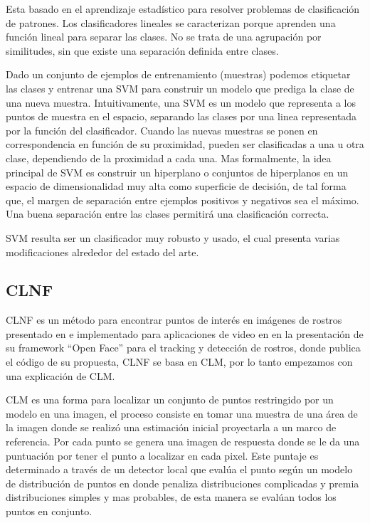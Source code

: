 Esta basado en el aprendizaje estadístico para resolver problemas de clasificación de patrones. Los clasificadores lineales se caracterizan porque aprenden una función lineal para separar las clases. No se trata de una agrupación por similitudes, sin que existe una separación definida entre clases.

Dado un conjunto de ejemplos de entrenamiento (muestras) podemos etiquetar las clases y entrenar una SVM para construir un modelo que prediga la clase de una nueva muestra. Intuitivamente, una SVM es un modelo que representa a los puntos de muestra en el espacio, separando las clases por una linea representada por la función del clasificador. Cuando las nuevas muestras se ponen en correspondencia en función de su proximidad, pueden ser clasificadas a una u otra clase, dependiendo de la proximidad a cada una. Mas formalmente, la idea principal de SVM es construir un hiperplano o conjuntos de hiperplanos en un espacio de dimensionalidad muy alta como superficie de decisión, de tal forma que, el margen de separación entre ejemplos positivos y negativos sea el máximo. Una buena separación entre las clases permitirá una clasificación correcta. 

\ac{SVM} resulta ser un clasificador muy robusto y usado, el cual presenta varias modificaciones alrededor del estado del arte.


\subsection{\acf{CLNF}}
\ac{CLNF} es un método para encontrar puntos de interés en imágenes de rostros presentado en \cite{baltrusaitis2013constrained} e implementado para aplicaciones de video en \cite{Baltrusaitis2016} en la presentación de su framework ``Open Face'' para el tracking y detección de rostros, donde publica el código de su propuesta, \ac{CLNF} se basa en \ac{CLM}, por lo tanto empezamos con una explicación de \ac{CLM}.

\ac{CLM} es una forma para localizar un conjunto de puntos restringido por un modelo en una imagen, el proceso consiste en tomar una muestra de una área de la imagen donde se realizó una estimación inicial proyectarla a un marco de referencia. Por cada punto se genera una imagen de respuesta donde se le da una puntuación por tener el punto a localizar en cada pixel. Este puntaje es determinado a través de un detector local que evalúa el punto según un modelo de distribución de puntos en donde penaliza distribuciones complicadas y premia distribuciones simples y mas probables, de esta manera se evalúan todos los puntos en conjunto.

